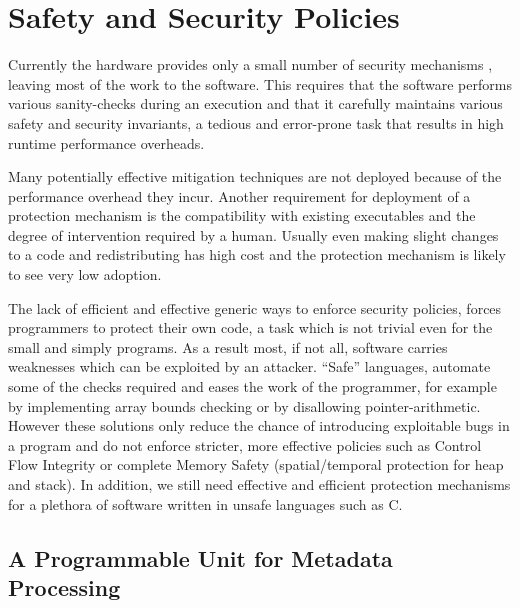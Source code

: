 \chapter{Safety and Security Policies}\label{ch:policies}
Currently the hardware provides only a small number of security mechanisms , 
leaving most of the work to the software. This requires that the software 
performs various sanity-checks during an execution and that it carefully 
maintains various safety and security invariants, a tedious and error-prone task
that results in high runtime performance overheads.  

Many potentially effective mitigation techniques are not deployed because of the
performance overhead they incur. Another requirement for deployment of a 
protection mechanism is the compatibility with existing executables and 
the degree of intervention required by a human. 
Usually even making slight changes to a code and redistributing has high cost
and the protection mechanism is likely to see very low adoption. 

The lack of efficient and effective generic ways to enforce security policies, 
forces programmers to protect their own code, a task which is not trivial even 
for the small and simply programs. As a result most, if not all, software 
carries weaknesses which can be exploited by an attacker. ``Safe'' languages, 
automate some of the checks required and eases the work of the programmer,
for example by implementing array bounds checking or by disallowing 
pointer-arithmetic. However these solutions only reduce the chance of 
introducing exploitable bugs in a program and do not enforce stricter, 
more effective policies such as Control Flow Integrity
or complete Memory Safety (spatial/temporal protection for heap and stack). 
In addition, we still need effective and efficient protection mechanisms for a 
plethora of software written in unsafe languages such as C.

\section{A Programmable Unit for Metadata Processing}\label{sec:pump}


